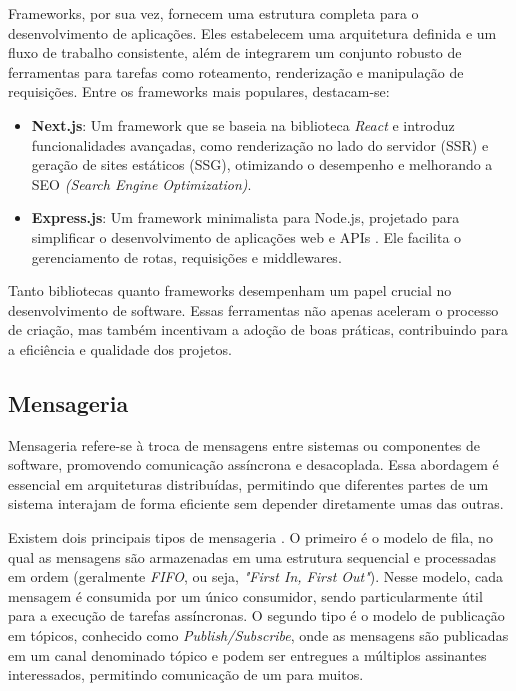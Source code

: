 Frameworks, por sua vez, fornecem uma estrutura completa para o desenvolvimento de aplicações. Eles estabelecem uma arquitetura definida e um fluxo de trabalho consistente, além de integrarem um conjunto robusto de ferramentas para tarefas como roteamento, renderização e manipulação de requisições. Entre os frameworks mais populares, destacam-se:
\begin{itemize}
    \item \textbf{Next.js}: Um framework que se baseia na biblioteca \emph{React} \cite{what-is-nextjs} e introduz funcionalidades avançadas, como renderização no lado do servidor (SSR) e geração de sites estáticos (SSG), otimizando o desempenho e melhorando a SEO \emph{(Search Engine Optimization)}.
    \item \textbf{Express.js}: Um framework minimalista para Node.js, projetado para simplificar o desenvolvimento de aplicações web e APIs \cite{expressjs}. Ele facilita o gerenciamento de rotas, requisições e middlewares.
\end{itemize}

Tanto bibliotecas quanto frameworks desempenham um papel crucial no desenvolvimento de software. Essas ferramentas não apenas aceleram o processo de criação, mas também incentivam a adoção de boas práticas, contribuindo para a eficiência e qualidade dos projetos.

\subsection{Mensageria}


Mensageria refere-se à troca de mensagens entre sistemas ou componentes de software, promovendo comunicação assíncrona e desacoplada. Essa abordagem é essencial em arquiteturas distribuídas, permitindo que diferentes partes de um sistema interajam de forma eficiente sem depender diretamente umas das outras.

Existem dois principais tipos de mensageria \cite{what-is-message-broker}. O primeiro é o modelo de fila, no qual as mensagens são armazenadas em uma estrutura sequencial e processadas em ordem (geralmente \emph{FIFO}, ou seja, \emph{"First In, First Out"}). Nesse modelo, cada mensagem é consumida por um único consumidor, sendo particularmente útil para a execução de tarefas assíncronas. O segundo tipo é o modelo de publicação em tópicos, conhecido como \emph{Publish/Subscribe}, onde as mensagens são publicadas em um canal denominado tópico e podem ser entregues a múltiplos assinantes interessados, permitindo comunicação de um para muitos.

